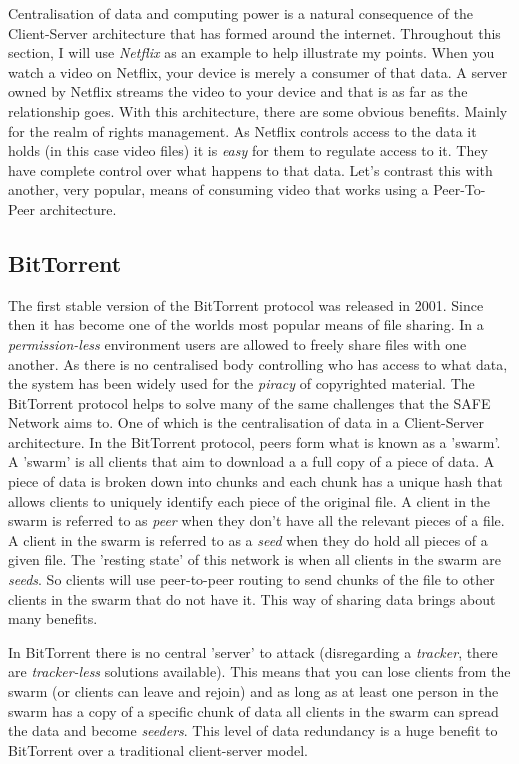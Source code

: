 Centralisation of data and computing power is a natural consequence of the Client-Server architecture that has formed around the internet. Throughout this section, I will use \textit{Netflix} as an example to help illustrate my points. When you watch a video on Netflix, your device is merely a consumer of that data. A server owned by Netflix streams the video to your device and that is as far as the relationship goes. With this architecture, there are some obvious benefits. Mainly for the realm of rights management. As Netflix controls access to the data it holds (in this case video files) it is \textit{easy} for them to regulate access to it. They have complete control over what happens to that data. Let's contrast this with another, very popular, means of consuming video that works using a Peer-To-Peer architecture.

\subsection{BitTorrent}

The first stable version of the BitTorrent protocol was released in 2001. Since then it has become one of the worlds most popular means of file sharing. In a \textit{permission-less} environment users are allowed to freely share files with one another. As there is no centralised body controlling who has access to what data, the system has been widely used for the \textit{piracy} of copyrighted material. The BitTorrent protocol helps to solve many of the same challenges that the SAFE Network aims to. One of which is the centralisation of data in a Client-Server architecture. In the BitTorrent protocol, peers form what is known as a 'swarm'. A 'swarm' is all clients that aim to download a a full copy of a piece of data. A piece of data is broken down into chunks and each chunk has a unique hash that allows clients to uniquely identify each piece of the original file. A client in the swarm is referred to as \textit{peer} when they don't have all the relevant pieces of a file. A client in the swarm is referred to as a \textit{seed} when they do hold all pieces of a given file. The 'resting state' of this network is when all clients in the swarm are \textit{seeds}. So clients will use peer-to-peer routing to send chunks of the file to other clients in the swarm that do not have it. This way of sharing data brings about many benefits. 

In BitTorrent there is no central 'server' to attack (disregarding a \textit{tracker}, there are \textit{tracker-less} solutions available). This means that you can lose clients from the swarm (or clients can leave and rejoin) and as long as at least one person in the swarm has a copy of a specific chunk of data all clients in the swarm can spread the data and become \textit{seeders}. This level of data redundancy is a huge benefit to BitTorrent over a traditional client-server model.

